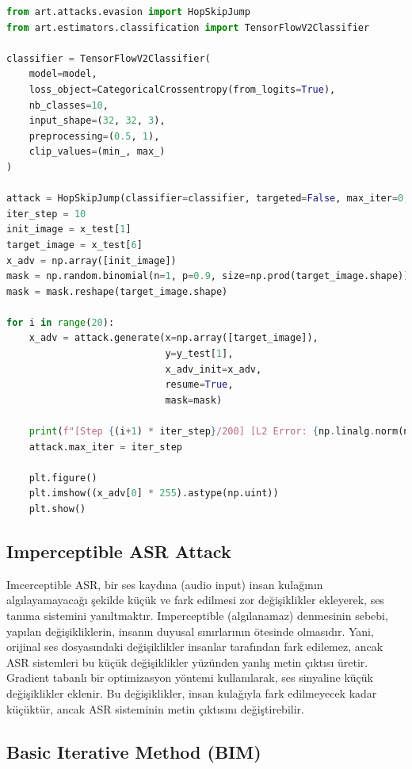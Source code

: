 \begin{lstlisting}[language=Python]
from art.attacks.evasion import HopSkipJump
from art.estimators.classification import TensorFlowV2Classifier

classifier = TensorFlowV2Classifier(
    model=model,
    loss_object=CategoricalCrossentropy(from_logits=True),
    nb_classes=10,
    input_shape=(32, 32, 3),
    preprocessing=(0.5, 1),
    clip_values=(min_, max_)
)

attack = HopSkipJump(classifier=classifier, targeted=False, max_iter=0, max_eval=1000, init_eval=10)
iter_step = 10
init_image = x_test[1]
target_image = x_test[6]
x_adv = np.array([init_image])
mask = np.random.binomial(n=1, p=0.9, size=np.prod(target_image.shape))
mask = mask.reshape(target_image.shape)

for i in range(20):
    x_adv = attack.generate(x=np.array([target_image]),
                            y=y_test[1],
                            x_adv_init=x_adv, 
                            resume=True, 
                            mask=mask)

    print(f"[Step {(i+1) * iter_step}/200] [L2 Error: {np.linalg.norm(np.reshape(x_adv[0] - target_image, [-1])):.2f}]")
    attack.max_iter = iter_step

    plt.figure()
    plt.imshow((x_adv[0] * 255).astype(np.uint))
    plt.show()
\end{lstlisting}

\newpage

\subsection{Imperceptible ASR Attack}

Imcerceptible ASR, bir ses kaydına (audio input) insan kulağının algılayamayacağı şekilde küçük ve fark edilmesi zor değişiklikler ekleyerek, ses tanıma sistemini yanıltmaktır. Imperceptible (algılanamaz) denmesinin sebebi, yapılan değişikliklerin, insanın duyusal sınırlarının ötesinde olmasıdır. Yani, orijinal ses dosyasındaki değişiklikler insanlar tarafından fark edilemez, ancak ASR sistemleri bu küçük değişiklikler yüzünden yanlış metin çıktısı üretir. Gradient tabanlı bir optimizasyon yöntemi kullanılarak, ses sinyaline küçük değişiklikler eklenir. Bu değişiklikler, insan kulağıyla fark edilmeyecek kadar küçüktür, ancak ASR sisteminin metin çıktısını değiştirebilir.

\newpage

\subsection{Basic Iterative Method (BIM)}


